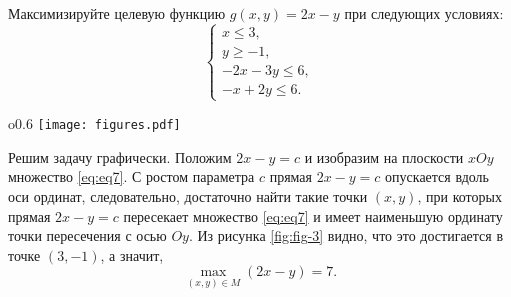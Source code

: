  Максимизируйте целевую функцию $g(x, y)=2x-y$ при следующих условиях:
\begin{equation} \label{eq:eq7}\tag{M}
\begin{cases}
x \le 3,\\
y \ge -1,\\
-2x-3y \le 6,\\
-x+2y \le 6.
\end{cases}
\end{equation}

\begin{wrapfigure}{o}{0.6\textwidth}
\centering
\texttt{[image: figures.pdf]}
\caption{Графическое решение задачи}
\label{fig:fig-3}
\end{wrapfigure}


Решим задачу графически. Положим $2x-y=c$ и изобразим на плоскости $xOy$ множество \ref{eq:eq7}. С ростом параметра $c$ прямая $2x-y=c$ опускается вдоль оси ординат, следовательно, достаточно найти такие точки $(x, y)$, при которых прямая $2x-y=c$ пересекает множество \ref{eq:eq7} и имеет наименьшую ординату точки пересечения с осью $Oy$. Из рисунка \ref{fig:fig-3} видно, что это достигается в точке $(3, -1)$, а значит, 
\[
\max_{(x, y) \in M}(2x-y) = 7.
\]

































